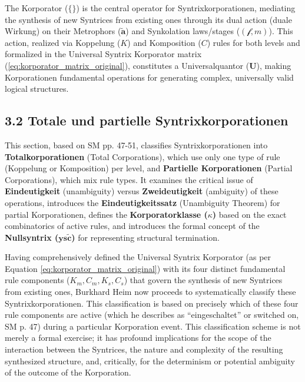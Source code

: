 \documentclass[12pt]{article}
\newcommand{\q}[1]{\enquote{#1}}
\newcommand{\metrophor}{\bm{\widetilde{a}}}
\newcommand{\synkolator}{\mathcal{f}}
\newcommand{\synkolationsstufe}{m}
\newcommand{\universalquantor}{\bm{U}}
\newcommand{\nullsyntrix}{\bm{ys\widetilde{c}}}
\begin{document}
The Korporator (\( \{ \} \)) is the central operator for Syntrixkorporationen, mediating the synthesis of new Syntrices from existing ones through its dual action (duale Wirkung) on their Metrophors (\(\metrophor\)) and Synkolation laws/stages (\((\synkolator, \synkolationsstufe)\)). This action, realized via Koppelung (\(K\)) and Komposition (\(C\)) rules for both levels and formalized in the Universal Syntrix Korporator matrix (\eqref{eq:korporator_matrix_original}), constitutes a Universalquantor (\(\universalquantor\)), making Korporationen fundamental operations for generating complex, universally valid logical structures.

\subsection{3.2 Totale und partielle Syntrixkorporationen}
\label{sec:total_partial_korp}

This section, based on SM pp. 47-51, classifies Syntrixkorporationen into \textbf{Totalkorporationen} (Total Corporations), which use only one type of rule (Koppelung or Komposition) per level, and \textbf{Partielle Korporationen} (Partial Corporations), which mix rule types. It examines the critical issue of \textbf{Eindeutigkeit} (unambiguity) versus \textbf{Zweideutigkeit} (ambiguity) of these operations, introduces the \textbf{Eindeutigkeitssatz} (Unambiguity Theorem) for partial Korporationen, defines the \textbf{Korporatorklasse (\(\kappa\))} based on the exact combinatorics of active rules, and introduces the formal concept of the \textbf{Nullsyntrix (\(\nullsyntrix\))} for representing structural termination.

Having comprehensively defined the Universal Syntrix Korporator (as per Equation \eqref{eq:korporator_matrix_original}) with its four distinct fundamental rule components (\( K_m, C_m, K_s, C_s \)) that govern the synthesis of new Syntrices from existing ones, Burkhard Heim now proceeds to systematically classify these Syntrixkorporationen. This classification is based on precisely which of these four rule components are active (which he describes as \q{eingeschaltet} or switched on, SM p. 47) during a particular Korporation event. This classification scheme is not merely a formal exercise; it has profound implications for the scope of the interaction between the Syntrices, the nature and complexity of the resulting synthesized structure, and, critically, for the determinism or potential ambiguity of the outcome of the Korporation.
\end{document}
